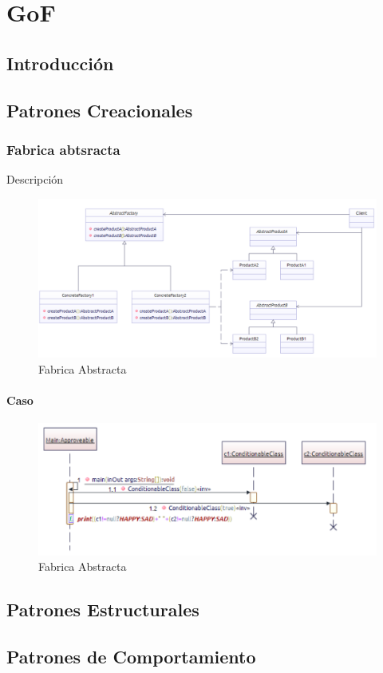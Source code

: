 \chapter{GoF}
\section{Introducción}
\newpage

\section{Patrones Creacionales}
\newpage


\subsection{Fabrica abtsracta}
Descripción
\begin{figure}[th!]
	\centering
	\includegraphics[width=0.7\linewidth]{arquitectura/diseno/imgs/m_fabrica}
	\caption{Fabrica Abstracta}
\end{figure}

\newpage

\subsubsection{Caso}

\begin{figure}[th!]
	\centering
	\includegraphics[width=0.7\linewidth]{arquitectura/diseno/imgs/s_fabrica}
	\caption{Fabrica Abstracta}
\end{figure}

\newpage


\section{Patrones Estructurales}
\newpage


\section{Patrones de Comportamiento}
\newpage



